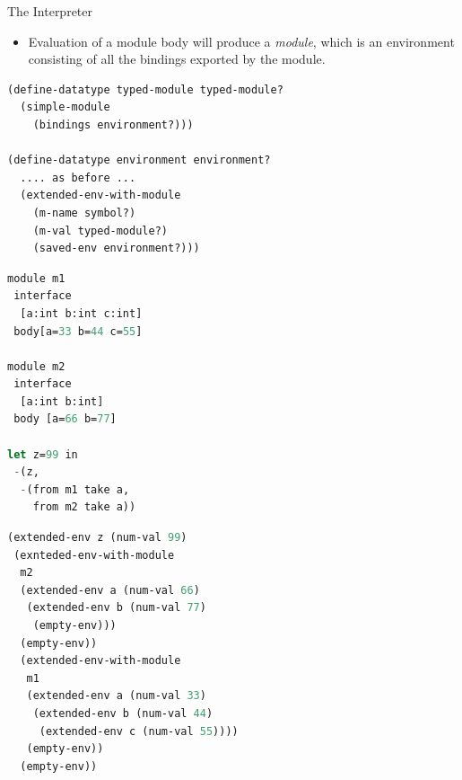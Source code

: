 \documentclass{article}
\begin{document}
\begin{huge}

The Interpreter
\begin{itemize}
\item Evaluation of a module body will produce a {\it module}, which is
an environment consisting of all the bindings exported by the module.
\end{itemize}

\begin{lstlisting}[language=Lisp]
(define-datatype typed-module typed-module?
  (simple-module
    (bindings environment?)))  
    
(define-datatype environment environment?
  .... as before ...
  (extended-env-with-module 
    (m-name symbol?)
    (m-val typed-module?)
    (saved-env environment?)))
\end{lstlisting}


\begin{minipage}[t]{.43\textwidth}
\begin{lstlisting}[language=Lisp]
module m1
 interface
  [a:int b:int c:int]
 body[a=33 b=44 c=55]

module m2
 interface
  [a:int b:int]
 body [a=66 b=77]

let z=99 in
 -(z, 
  -(from m1 take a,
    from m2 take a))
\end{lstlisting}          
\end{minipage}
\begin{minipage}[t]{.5\textwidth}
\begin{lstlisting}[language=Lisp]
(extended-env z (num-val 99)
 (exnteded-env-with-module
  m2 
  (extended-env a (num-val 66)
   (extended-env b (num-val 77)
    (empty-env)))
  (empty-env))
  (extended-env-with-module
   m1
   (extended-env a (num-val 33)
    (extended-env b (num-val 44)
     (extended-env c (num-val 55))))
   (empty-env))
  (empty-env))
\end{lstlisting}   
\end{minipage}



\end{huge}
\end{document}
